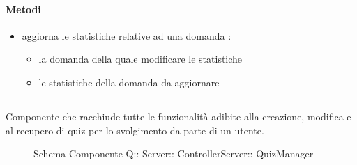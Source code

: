 \paragraph{Metodi}
\begin{itemize}
\item {}
\newline
aggiorna le statistiche relative ad una domanda
\newline
{} :
\begin{itemize}
\item {}
\newline
la domanda della quale modificare le statistiche
\item {}
\newline
le statistiche della domanda da aggiornare
\end{itemize}
\end{itemize}
\subsection{}
Componente che racchiude tutte le funzionalità adibite alla creazione, modifica e al recupero di quiz per lo svolgimento da parte di un utente.
\begin{figure}[H]
\centering
\noindent{}
\caption[Schema Componente Quizzipedia::Server::ControllerServer::QuizManager]{Schema Componente Q:: Server:: ControllerServer:: QuizManager}
\end{figure}
